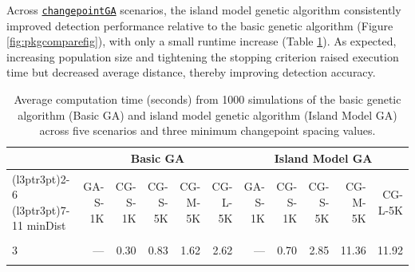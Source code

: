 Across \href{https://CRAN.R-project.org/package=changepointGA}{\texttt{changepointGA}} scenarios, the island model genetic algorithm consistently improved detection performance relative to the basic genetic algorithm (Figure \ref{fig:pkgcomparefig}), with only a small runtime increase (Table \ref{tab:CompTimeTab}). As expected, increasing population size and tightening the stopping criterion raised execution time but decreased average distance, thereby improving detection accuracy.

\begin{table}[!h]
\centering
\caption{\label{tab:CompTimeTab}Average computation time (seconds) from 1000 simulations of the basic genetic algorithm (Basic GA) and island model genetic algorithm (Island Model GA) across five scenarios and three minimum changepoint spacing values.}
\centering
\fontsize{6}{8}\selectfont
\begin{tabular}[t]{>{}l|rrrr>{}r|rrrrr}
\toprule
\multicolumn{1}{c}{ } & \multicolumn{5}{c}{Basic GA} & \multicolumn{5}{c}{Island Model GA} \\
\cmidrule(l{3pt}r{3pt}){2-6} \cmidrule(l{3pt}r{3pt}){7-11}
minDist & GA-S-1K & CG-S-1K & CG-S-5K & CG-M-5K & CG-L-5K & GA-S-1K & CG-S-1K & CG-S-5K & CG-M-5K & CG-L-5K\\
\midrule
\cellcolor{gray!10}{1} & \cellcolor{gray!10}{3512.69} & \cellcolor{gray!10}{0.98} & \cellcolor{gray!10}{1.92} & \cellcolor{gray!10}{3.78} & \cellcolor{gray!10}{6.56} & \cellcolor{gray!10}{3428.14} & \cellcolor{gray!10}{1.25} & \cellcolor{gray!10}{5.07} & \cellcolor{gray!10}{19.98} & \cellcolor{gray!10}{21.23}\\
3 & --- & 0.30 & 0.83 & 1.62 & 2.62 & --- & 0.70 & 2.85 & 11.36 & 11.92\\
\cellcolor{gray!10}{5} & \cellcolor{gray!10}{---} & \cellcolor{gray!10}{0.30} & \cellcolor{gray!10}{0.84} & \cellcolor{gray!10}{1.58} & \cellcolor{gray!10}{2.63} & \cellcolor{gray!10}{---} & \cellcolor{gray!10}{0.70} & \cellcolor{gray!10}{2.90} & \cellcolor{gray!10}{11.51} & \cellcolor{gray!10}{12.08}\\
\bottomrule
\end{tabular}
\end{table}

